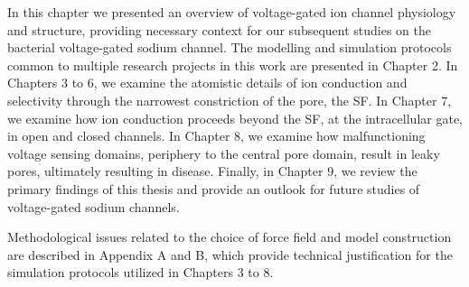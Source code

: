 \begin{refsection}
In this chapter we presented an overview of voltage-gated ion channel physiology and structure, providing necessary context for our subsequent studies on the bacterial voltage-gated sodium channel. The modelling and simulation protocols common to multiple research projects in this work are presented in Chapter 2. In Chapters 3 to 6, we examine the atomistic details of ion conduction and selectivity through the narrowest constriction of the pore, the SF. In Chapter 7, we examine how ion conduction proceeds beyond the SF, at the intracellular gate, in open and closed channels. In Chapter 8, we examine how malfunctioning voltage sensing domains, periphery to the central pore domain, result in leaky pores, ultimately resulting in disease. Finally, in Chapter 9, we review the primary findings of this thesis and provide an outlook for future studies of voltage-gated sodium channels.

Methodological issues related to the choice of force field and model construction are described in Appendix A and B, which provide technical justification for the simulation protocols utilized in Chapters 3 to 8. 

\printbibliography[heading=subbibnumbered,title={References}]
\end{refsection}